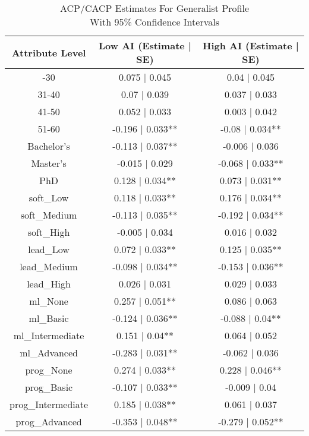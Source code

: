 \begin{table}[t]
\caption*{
{\large ACP/CACP Estimates For Generalist Profile} \\ 
{\small With 95\% Confidence Intervals}
} 
\fontsize{12.0pt}{14.4pt}\selectfont
\begin{tabular*}{\linewidth}{@{\extracolsep{\fill}}ccc}
\toprule
Attribute Level & Low AI (Estimate | SE) & High AI (Estimate | SE) \\ 
\midrule\addlinespace[2.5pt]
21-30 & 0.075 | 0.045 & 0.04 | 0.045 \\ 
31-40 & 0.07 | 0.039 & 0.037 | 0.033 \\ 
41-50 & 0.052 | 0.033 & 0.003 | 0.042 \\ 
51-60 & -0.196 | 0.033** & -0.08 | 0.034** \\ 
Bachelor's & -0.113 | 0.037** & -0.006 | 0.036 \\ 
Master's & -0.015 | 0.029 & -0.068 | 0.033** \\ 
PhD & 0.128 | 0.034** & 0.073 | 0.031** \\ 
soft\_Low & 0.118 | 0.033** & 0.176 | 0.034** \\ 
soft\_Medium & -0.113 | 0.035** & -0.192 | 0.034** \\ 
soft\_High & -0.005 | 0.034 & 0.016 | 0.032 \\ 
lead\_Low & 0.072 | 0.033** & 0.125 | 0.035** \\ 
lead\_Medium & -0.098 | 0.034** & -0.153 | 0.036** \\ 
lead\_High & 0.026 | 0.031 & 0.029 | 0.033 \\ 
ml\_None & 0.257 | 0.051** & 0.086 | 0.063 \\ 
ml\_Basic & -0.124 | 0.036** & -0.088 | 0.04** \\ 
ml\_Intermediate & 0.151 | 0.04** & 0.064 | 0.052 \\ 
ml\_Advanced & -0.283 | 0.031** & -0.062 | 0.036 \\ 
prog\_None & 0.274 | 0.033** & 0.228 | 0.046** \\ 
prog\_Basic & -0.107 | 0.033** & -0.009 | 0.04 \\ 
prog\_Intermediate & 0.185 | 0.038** & 0.061 | 0.037 \\ 
prog\_Advanced & -0.353 | 0.048** & -0.279 | 0.052** \\ 
\bottomrule
\end{tabular*}
\end{table}

